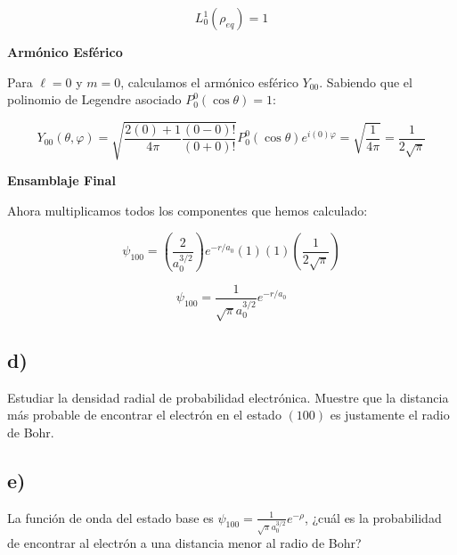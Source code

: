 \documentclass[a4paper]{article}
\begin{document}
$$L_0^1(\rho_{eq}) = 1$$

\textbf{Armónico Esférico}

Para $\ell=0$ y $m=0$, calculamos el armónico esférico $Y_{00}$. Sabiendo que el polinomio de Legendre asociado $P_0^0(\cos\theta) = 1$:

$$Y_{00}(\theta, \varphi) = \sqrt{\frac{2(0)+1}{4\pi} \frac{(0-0)!}{(0+0)!}} P_0^0(\cos\theta) e^{i(0)\varphi} = \sqrt{\frac{1}{4\pi}} = \frac{1}{2\sqrt{\pi}}$$

\textbf{Ensamblaje Final}

Ahora multiplicamos todos los componentes que hemos calculado:

$$\psi_{100} = \left( \frac{2}{a_0^{3/2}} \right) e^{-r/a_0} (1) (1) \left( \frac{1}{2\sqrt{\pi}} \right)$$


$$\psi_{100} = \frac{1}{\sqrt{\pi} a_0^{3/2}} e^{-r/a_0}$$



\subsection{d)} Estudiar la densidad radial de probabilidad electrónica. Muestre que la distancia más probable de encontrar el electrón en el estado $(100)$ es justamente el radio de Bohr.

\subsection{e)} La función de onda del estado base es $\psi_{100} = \frac{1}{\sqrt{\pi}a_0^{3/2}}e^{-\rho}$, ¿cuál es la probabilidad de encontrar al electrón a una distancia menor al radio de Bohr?





 
\end{document}
